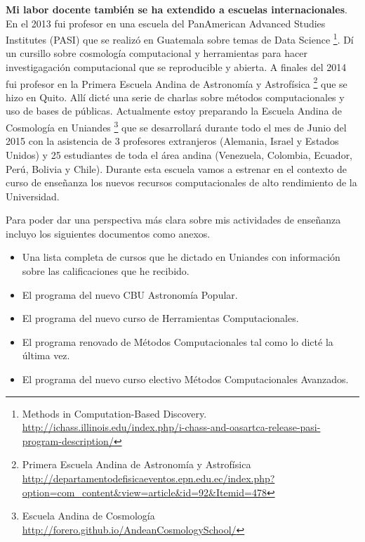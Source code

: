 \documentclass[letterpaper,12pt,onecolumn]{article}
\begin{document}
{\bf Mi labor docente tambi\'en se ha extendido a escuelas
internacionales}. En el 2013 fui profesor en una escuela del
PanAmerican Advanced Studies Institutes (PASI) que se realiz\'o en
Guatemala sobre temas de Data Science \footnote{Methods in
  Computation-Based
  Discovery. \url{http://ichass.illinois.edu/index.php/i-chass-and-oasartca-release-pasi-program-description/}}. D\'i
un cursillo sobre cosmolog\'ia computacional y herramientas para hacer
investigagaci\'on computacional que se reproducible y abierta. A
finales del 2014 fui profesor en la Primera Escuela Andina de Astronom\'ia y
Astrof\'isica \footnote{Primera Escuela Andina de Astronom\'ia y
  Astrof\'isica \url{http://departamentodefisicaeventos.epn.edu.ec/index.php?option=com_content&view=article&id=92&Itemid=478}}
que se hizo en Quito. All\'i dict\'e una serie de charlas sobre
m\'etodos computacionales y uso de bases de  p\'ublicas. Actualmente
estoy preparando la Escuela Andina de Cosmolog\'ia en
Uniandes \footnote{Escuela Andina de Cosmolog\'ia \url{http://forero.github.io/AndeanCosmologySchool/}}
que se desarrollar\'a durante todo el mes de Junio del 2015 con la
asistencia de 3 profesores extranjeros (Alemania, Israel y Estados
Unidos) y 25 estudiantes de toda el \'area andina (Venezuela,
Colombia, Ecuador, Per\'u, Bolivia y Chile). Durante esta escuela
vamos a estrenar en el contexto de curso de ense\~nanza los nuevos recursos
computacionales de alto rendimiento de la Universidad.


Para poder dar una perspectiva m\'as clara sobre mis actividades de
ense\~nanza incluyo los siguientes documentos como anexos.
\begin{itemize}
\item Una lista completa de cursos que he dictado en Uniandes con
  informaci\'on sobre las calificaciones que he recibido. 
\item El programa del nuevo CBU Astronom\'ia Popular.
\item El programa del nuevo curso de Herramientas Computacionales.
\item El programa renovado de M\'etodos Computacionales tal como lo
  dict\'e la \'ultima vez.
\item El programa del nuevo curso electivo M\'etodos Computacionales
  Avanzados. 
\end{itemize}
\end{document}
